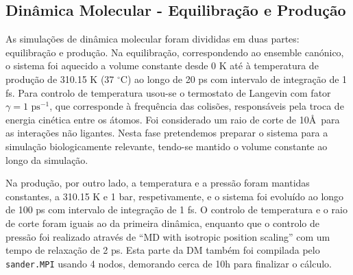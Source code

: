\documentclass[12pt,a4paper]{article}
\begin{document}
\subsection{Dinâmica Molecular - Equilibração e Produção}
	
	
	As simulações de dinâmica molecular foram divididas em duas partes: equilibração e produção. Na equilibração, correspondendo ao ensemble canónico, o sistema foi aquecido a volume constante desde 0 K até à temperatura de produção de 310.15 K (37 $^\circ$C) ao longo de 20 ps com intervalo de integração de 1 fs. Para controlo de temperatura usou-se o termostato de Langevin com fator $\gamma = 1 \textrm{ ps}^{-1}$, que corresponde à frequência das colisões, responsáveis pela troca de energia cinética entre os átomos. Foi considerado um raio de corte de 10\AA \ para as interações não ligantes. Nesta fase pretendemos preparar o sistema para a simulação biologicamente relevante, tendo-se mantido o volume constante ao longo da simulação.
	
	Na produção, por outro lado, a temperatura e a pressão foram mantidas constantes, a 310.15 K e 1 bar, respetivamente, e o sistema foi evoluído ao longo de 100 ps com intervalo de integração de 1 fs. O controlo de temperatura e o raio de corte foram iguais ao da primeira dinâmica, enquanto que o controlo de pressão foi realizado através de ``MD with isotropic position scaling'' com um tempo de relaxação de 2 ps. Esta parte da DM também foi compilada pelo \verb|sander.MPI| usando 4 nodos, demorando cerca de 10h para finalizar o cálculo.
	
\end{document}
